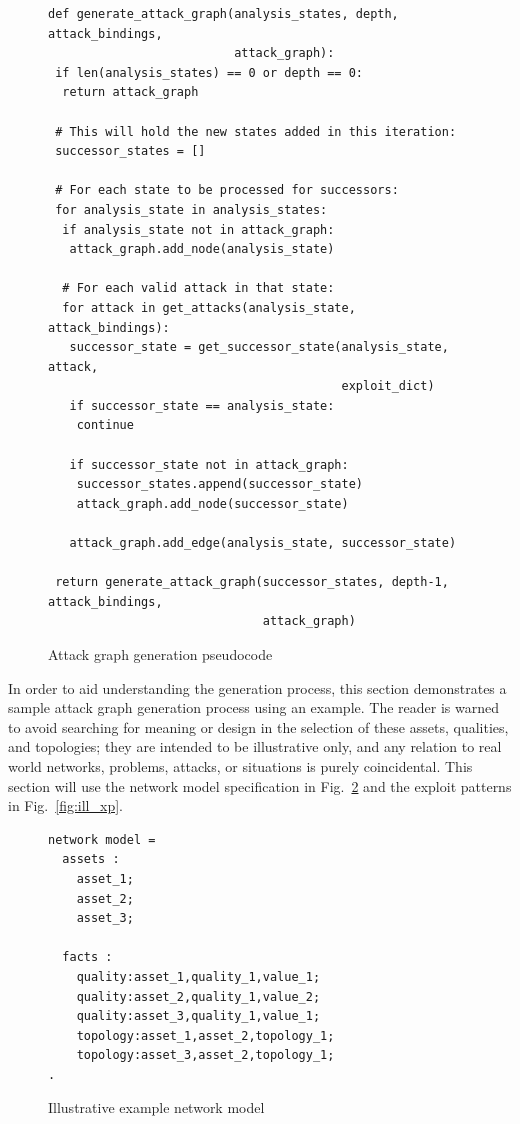 \begin{figure}
\begin{lstlisting}
def generate_attack_graph(analysis_states, depth, attack_bindings,
                          attack_graph):
 if len(analysis_states) == 0 or depth == 0:
  return attack_graph
 
 # This will hold the new states added in this iteration:
 successor_states = []

 # For each state to be processed for successors:
 for analysis_state in analysis_states:
  if analysis_state not in attack_graph:
   attack_graph.add_node(analysis_state)

  # For each valid attack in that state:
  for attack in get_attacks(analysis_state, attack_bindings):
   successor_state = get_successor_state(analysis_state, attack,
                                         exploit_dict)
   if successor_state == analysis_state:
    continue
       
   if successor_state not in attack_graph:
    successor_states.append(successor_state)
    attack_graph.add_node(successor_state)
   
   attack_graph.add_edge(analysis_state, successor_state)
      
 return generate_attack_graph(successor_states, depth-1, attack_bindings,
                              attack_graph)
\end{lstlisting}
\caption{Attack graph generation pseudocode}
\label{fig:ag_generation_pc}
\end{figure}
In order to aid understanding the generation process, this section demonstrates a
sample attack graph generation process using an example. The reader is warned to
avoid searching for meaning or design in the selection of these assets, qualities,
and topologies; they are intended to be illustrative only, and any relation to 
real world networks, problems, attacks, or situations is purely coincidental.
This section will use the network model specification in Fig.~\ref{fig:ill_nm}
and the exploit patterns in Fig.~\ref{fig:ill_xp}.
\begin{figure}
\begin{lstlisting}
network model = 
  assets :
    asset_1;
    asset_2;
    asset_3;

  facts :
    quality:asset_1,quality_1,value_1;
    quality:asset_2,quality_1,value_2;
    quality:asset_3,quality_1,value_1;
    topology:asset_1,asset_2,topology_1;
    topology:asset_3,asset_2,topology_1;
.
\end{lstlisting}
\caption{Illustrative example network model}
\label{fig:ill_nm}
\end{figure}

